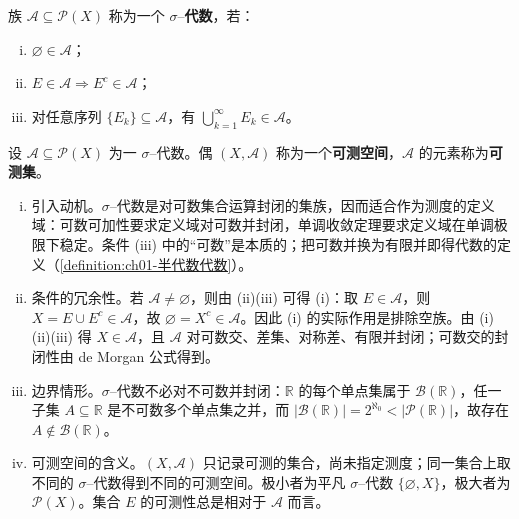 \documentclass[../../main.tex]{subfiles}%
\begin{document}
\begin{definition}\label{definition:ch01-sigma代数}
族 $\mathcal{A}\subseteq\mathcal{P}(X)$ 称为一个 $\sigma$--\textbf{代数}，若：
\begin{enumerate}[(i)]
\item $\varnothing\in\mathcal{A}$；
\item $E\in\mathcal{A}\Rightarrow E^c\in\mathcal{A}$；
\item 对任意序列 $\{E_k\}\subseteq\mathcal{A}$，有 $\bigcup_{k=1}^\infty E_k\in\mathcal{A}$。
\end{enumerate}
\end{definition}

\begin{definition}\label{definition:ch01-可测空间}
设 $\mathcal{A}\subseteq\mathcal{P}(X)$ 为一 $\sigma$--代数。偶 $(X,\mathcal{A})$ 称为一个\textbf{可测空间}，$\mathcal{A}$ 的元素称为\textbf{可测集}。
\end{definition}

\begin{remark}\label{remark:ch01-sigma代数可测空间}
\begin{enumerate}[(i)]
\item 引入动机。$\sigma$--代数是对可数集合运算封闭的集族，因而适合作为测度的定义域：可数可加性要求定义域对可数并封闭，单调收敛定理要求定义域在单调极限下稳定。条件 (iii) 中的“可数”是本质的；把可数并换为有限并即得代数的定义（\cref{definition:ch01-半代数代数}）。
\item 条件的冗余性。若 $\mathcal{A}\neq\varnothing$，则由 (ii)(iii) 可得 (i)：取 $E\in\mathcal{A}$，则 $X=E\cup E^c\in\mathcal{A}$，故 $\varnothing=X^c\in\mathcal{A}$。因此 (i) 的实际作用是排除空族。由 (i)(ii)(iii) 得 $X\in\mathcal{A}$，且 $\mathcal{A}$ 对可数交、差集、对称差、有限并封闭；可数交的封闭性由 de Morgan 公式得到。
\item 边界情形。$\sigma$--代数不必对不可数并封闭：$\mathbb{R}$ 的每个单点集属于 $\mathcal{B}(\mathbb{R})$，任一子集 $A\subseteq\mathbb{R}$ 是不可数多个单点集之并，而 $\lvert\mathcal{B}(\mathbb{R})\rvert=2^{\aleph_0}<\lvert\mathcal{P}(\mathbb{R})\rvert$，故存在 $A\notin\mathcal{B}(\mathbb{R})$。
\item 可测空间的含义。$(X,\mathcal{A})$ 只记录可测的集合，尚未指定测度；同一集合上取不同的 $\sigma$--代数得到不同的可测空间。极小者为平凡 $\sigma$--代数 $\{\varnothing,X\}$，极大者为 $\mathcal{P}(X)$。集合 $E$ 的可测性总是相对于 $\mathcal{A}$ 而言。
\end{enumerate}
\end{remark}
\end{document}
